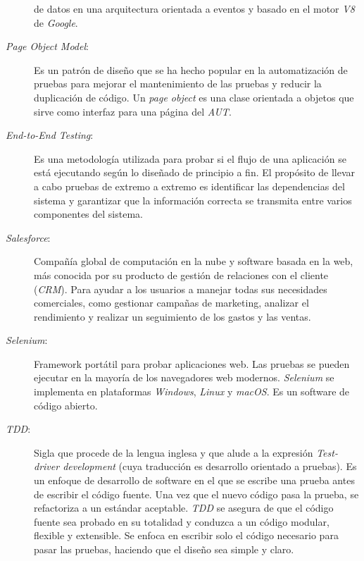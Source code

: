 \begin{description}
    de datos en una arquitectura orientada a eventos y basado en el motor
    \emph{V8} de \emph{Google}.
\item [\emph{Page Object Model}:] Es un patrón de diseño que se ha hecho popular
    en la automatización de pruebas para mejorar el mantenimiento de las pruebas
    y reducir la duplicación de código. Un \emph{page object} es una clase
    orientada a objetos que sirve como interfaz para una página del \emph{AUT}.
\item [\emph{End-to-End Testing}:] Es una metodología utilizada para probar si
    el flujo de una aplicación se está ejecutando según lo diseñado de principio
    a fin. El propósito de llevar a cabo pruebas de extremo a extremo es
    identificar las dependencias del sistema y garantizar que la información
    correcta se transmita entre varios componentes del sistema.
\item [\emph{Salesforce}:] Compañía global de computación en la nube y software
    basada en la web, más conocida por su producto de gestión de relaciones con
    el cliente (\emph{CRM}). Para ayudar a los usuarios a manejar todas sus
    necesidades comerciales, como gestionar campañas de marketing, analizar el
    rendimiento y realizar un seguimiento de los gastos y las ventas.
\item [\emph{Selenium}:] Framework portátil para probar aplicaciones web. Las
    pruebas se pueden ejecutar en la mayoría de los navegadores web modernos.
    \emph{Selenium} se implementa en plataformas \emph{Windows}, \emph{Linux} y
    \emph{macOS}. Es un software de código abierto.
\item [\emph{TDD}:] Sigla que procede de la lengua inglesa y que alude a la
    expresión \emph{Test-driver development} (cuya traducción es desarrollo
    orientado a pruebas). Es un enfoque de desarrollo de software en el que se
    escribe una prueba antes de escribir el código fuente. Una vez que el nuevo
    código pasa la prueba, se refactoriza a un estándar aceptable. \emph{TDD} se
    asegura de que el código fuente sea probado en su totalidad y conduzca a un
    código modular, flexible y extensible. Se enfoca en escribir solo el código
    necesario para pasar las pruebas, haciendo que el diseño sea simple y claro.
\end{description}


